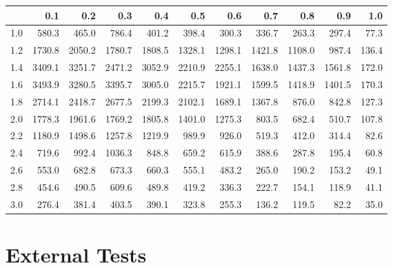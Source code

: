 \begin{tabular}{r|rrrrrrrrrr}
  \hline
 & 0.1 & 0.2 & 0.3 & 0.4 & 0.5 & 0.6 & 0.7 & 0.8 & 0.9 & 1.0 \\ 
  \hline
1.0 & 580.3 & 465.0 & 786.4 & 401.2 & 398.4 & 300.3 & 336.7 & 263.3 & 297.4 & 77.3 \\ 
  1.2 & 1730.8 & 2050.2 & 1780.7 & 1808.5 & 1328.1 & 1298.1 & 1421.8 & 1108.0 & 987.4 & 136.4 \\ 
  1.4 & 3409.1 & 3251.7 & 2471.2 & 3052.9 & 2210.9 & 2255.1 & 1638.0 & 1437.3 & 1561.8 & 172.0 \\ 
  1.6 & 3493.9 & 3280.5 & 3395.7 & 3005.0 & 2215.7 & 1921.1 & 1599.5 & 1418.9 & 1401.5 & 170.3 \\ 
  1.8 & 2714.1 & 2418.7 & 2677.5 & 2199.3 & 2102.1 & 1689.1 & 1367.8 & 876.0 & 842.8 & 127.3 \\ 
  2.0 & 1778.3 & 1961.6 & 1769.2 & 1805.8 & 1401.0 & 1275.3 & 803.5 & 682.4 & 510.7 & 107.8 \\ 
  2.2 & 1180.9 & 1498.6 & 1257.8 & 1219.9 & 989.9 & 926.0 & 519.3 & 412.0 & 314.4 & 82.6 \\ 
  2.4 & 719.6 & 992.4 & 1036.3 & 848.8 & 659.2 & 615.9 & 388.6 & 287.8 & 195.4 & 60.8 \\ 
  2.6 & 553.0 & 682.8 & 673.3 & 660.3 & 555.1 & 483.2 & 265.0 & 190.2 & 153.2 & 49.1 \\ 
  2.8 & 454.6 & 490.5 & 609.6 & 489.8 & 419.2 & 336.3 & 222.7 & 154.1 & 118.9 & 41.1 \\ 
  3.0 & 276.4 & 381.4 & 403.5 & 390.1 & 323.8 & 255.3 & 136.2 & 119.5 & 82.2 & 35.0 \\ 
   \hline
\end{tabular}



\section{External Tests}
